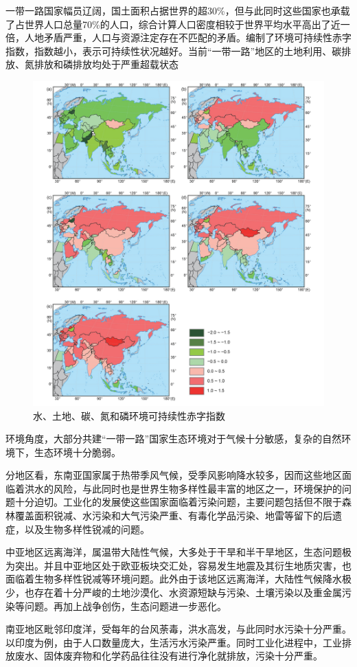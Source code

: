 \documentclass[a4paper,12pt]{ctexart}
\begin{document}
一带一路国家幅员辽阔，国土面积占据世界的超30\%，但与此同时这些国家也承载了占世界人口总量70\%的人口，综合计算人口密度相较于世界平均水平高出了近一倍，人地矛盾严重，人口与资源注定存在不匹配的矛盾。\citet{方恺2021}编制了环境可持续性赤字指数，指数越小，表示可持续性状况越好。当前“一带一路”地区的土地利用、碳排放、氮排放和磷排放均处于严重超载状态
\begin{figure}[H]
    \centering
    \includegraphics[width=0.8\linewidth]{img/ff.jpeg}
    \caption{水、土地、碳、氮和磷环境可持续性赤字指数\citet{方恺2021}}
\end{figure}

环境角度，大部分共建“一带一路”国家生态环境对于气候十分敏感，复杂的自然环境下，生态环境十分脆弱。

分地区看，东南亚国家属于热带季风气候，受季风影响降水较多，因而这些地区面临着洪水的风险，与此同时也是世界生物多样性最丰富的地区之一，环境保护的问题十分迫切。工业化的发展使这些国家面临着污染问题，主要问题包括但不限于森林覆盖面积锐减、水污染和大气污染严重、有毒化学品污染、地雷等留下的后遗症，以及生物多样性锐减的问题。

中亚地区远离海洋，属温带大陆性气候，大多处于干旱和半干旱地区，生态问题极为突出。并且中亚地区处于欧亚板块交汇处，容易发生地震及其衍生地质灾害，也面临着生物多样性锐减等环境问题。此外由于该地区远离海洋，大陆性气候降水极少，也存在着十分严峻的土地沙漠化、水资源短缺与污染、土壤污染以及重金属污染等问题。再加上战争创伤，生态问题进一步恶化。

南亚地区毗邻印度洋，受每年的台风荼毒，洪水高发，与此同时水污染十分严重。以印度为例，由于人口数量庞大，生活污水污染严重。同时工业化进程中，工业排放废水、固体废弃物和化学药品往往没有进行净化就排放，污染十分严重。
\end{document}
